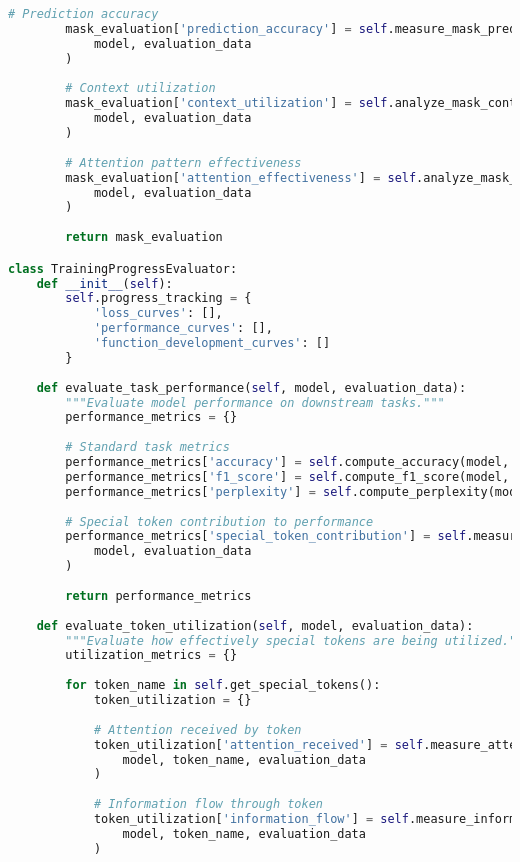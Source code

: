 \begin{lstlisting}[language=Python, caption=Comprehensive evaluation metrics framework for special token training]
        # Prediction accuracy
        mask_evaluation['prediction_accuracy'] = self.measure_mask_prediction_accuracy(
            model, evaluation_data
        )
        
        # Context utilization
        mask_evaluation['context_utilization'] = self.analyze_mask_context_utilization(
            model, evaluation_data
        )
        
        # Attention pattern effectiveness
        mask_evaluation['attention_effectiveness'] = self.analyze_mask_attention_patterns(
            model, evaluation_data
        )
        
        return mask_evaluation

class TrainingProgressEvaluator:
    def __init__(self):
        self.progress_tracking = {
            'loss_curves': [],
            'performance_curves': [],
            'function_development_curves': []
        }
    
    def evaluate_task_performance(self, model, evaluation_data):
        """Evaluate model performance on downstream tasks."""
        performance_metrics = {}
        
        # Standard task metrics
        performance_metrics['accuracy'] = self.compute_accuracy(model, evaluation_data)
        performance_metrics['f1_score'] = self.compute_f1_score(model, evaluation_data)
        performance_metrics['perplexity'] = self.compute_perplexity(model, evaluation_data)
        
        # Special token contribution to performance
        performance_metrics['special_token_contribution'] = self.measure_special_token_contribution(
            model, evaluation_data
        )
        
        return performance_metrics
    
    def evaluate_token_utilization(self, model, evaluation_data):
        """Evaluate how effectively special tokens are being utilized."""
        utilization_metrics = {}
        
        for token_name in self.get_special_tokens():
            token_utilization = {}
            
            # Attention received by token
            token_utilization['attention_received'] = self.measure_attention_received(
                model, token_name, evaluation_data
            )
            
            # Information flow through token
            token_utilization['information_flow'] = self.measure_information_flow(
                model, token_name, evaluation_data
            )
            

\end{lstlisting}
